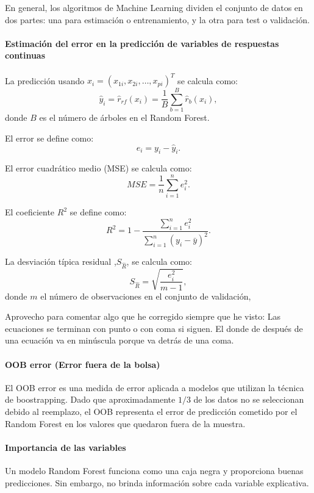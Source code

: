 {En general, los algoritmos de Machine Learning dividen el conjunto de datos en dos partes: una para estimación o entrenamiento, y la otra para test o validación.

\paragraph{Estimación del error en la predicción de variables de respuestas continuas}

La predicción usando \(x_i = (x_{1i}, x_{2i}, \ldots, x_{pi})^T\) se calcula como:
\[ \hat{y}_i = \hat{r}_{rf}(x_i) = \frac{1}{B} \sum_{b=1}^{B} \hat{r}_b(x_i),\]
donde \(B\) es el número de árboles en el Random Forest.

El error se define como:
\[ e_i = y_i - \hat{y}_i.\]

El error cuadrático medio (MSE) se calcula como:
\[ MSE = \frac{1}{n} \sum_{i=1}^{n} e_i^2.\]

El coeficiente \(R^2\) se define como:
\[ R^2 = 1 - \frac{\sum_{i=1}^{n} e_i^2}{\sum_{i=1}^{n} (y_i - \bar{y})^2}.\]

La desviación típica residual ,\(S_{\hat{R}}\), se calcula como:
\[ S_{\hat{R}} = \sqrt{\frac{e_i^2}{m-1}},\]
donde \(m\) el número de observaciones en el conjunto de validación, 

{\color{blue} Aprovecho para comentar algo que he corregido siempre que he visto: Las ecuaciones se terminan con punto o con coma si siguen. El donde de después de una ecuación va en minúscula porque va detrás de una coma.}

\paragraph{OOB error (Error fuera de la bolsa)}\label{sec:oob}

El OOB error es una medida de error aplicada a modelos que utilizan la técnica de boostrapping. Dado que aproximadamente \(1/3\) de los datos no se seleccionan debido al reemplazo, el OOB representa el error de predicción cometido por el Random Forest en los valores que quedaron fuera de la muestra.

\paragraph{Importancia de las variables}\label{sec:importancia-variables}

Un modelo Random Forest funciona como una caja negra y proporciona buenas predicciones. Sin embargo, no brinda información sobre cada variable explicativa.

}
